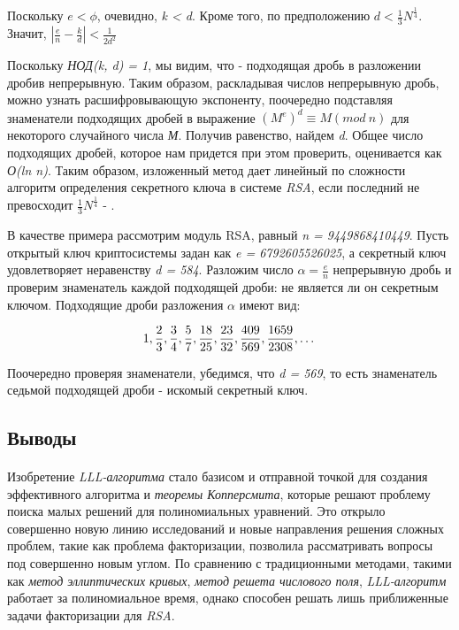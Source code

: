   Поскольку \textit{{$e < \phi$}}, очевидно, \textit{k < d}. Кроме того, по предположению \textit{{$d < \frac{1}{3} N^\frac{1}{4} $}}. Значит, 
  \textit{{$ |\frac{e}{n} - \frac{k}{d}| < \frac{1}{2 d^2} $}}
  
  Поскольку \textit{НОД(k, d) = 1}, мы видим, что - подходящая дробь в разложении дробив непрерывную. Таким образом, раскладывая числов непрерывную дробь, можно узнать 
  расшифровывающую экспоненту, поочередно подставляя знаменатели подходящих дробей в выражение $(M^{e})^{d} \equiv M (mod \: n)$ для некоторого случайного числа \textit{М}. 
  Получив равенство, найдем \textit{d}. Общее число подходящих дробей, которое нам придется при этом проверить, оценивается как \textit{О(ln n)}. 
  Таким образом, изложенный метод дает линейный по сложности алгоритм определения секретного ключа в системе \textit{RSA}, если последний не превосходит 
  \textit{{$\frac{1}{3} N^\frac{1}{4} $}} - \cite[Глава 9.4, страницы 174-177]{tilb06}.
  
  \begin{example}
    В качестве примера рассмотрим модуль RSA, равный \textit{n = 9449868410449}. Пусть открытый ключ криптосистемы задан как \textit{e = 6792605526025},
    а секретный ключ удовлетворяет неравенству \textit{d = 584}. Разложим число \textit{{$ \alpha = \frac{e}{n} $}} непрерывную дробь и проверим знаменатель каждой 
    подходящей дроби: не является ли он секретным ключом. Подходящие дроби разложения \textit{{$ \alpha $}} имеют вид:
    
      \begin{equation}
	\textit{{$ 1, \frac{2}{3}, \frac{3}{4}, \frac{5}{7}, \frac{18}{25}, \frac{23}{32}, \frac{409}{569}, \frac{1659}{2308}, \dots$}}
      \end{equation}

    Поочередно проверяя знаменатели, убедимся, что \textit{d = 569}, то есть знаменатель седьмой подходящей дроби - искомый секретный ключ.
  \end{example}
  
  
\subsection{Выводы}

\paragraph{} Изобретение \textit{LLL-алгоритма} стало базисом и отправной точкой для создания эффективного алгоритма и \textit{теоремы Копперсмита}, которые
  решают проблему поиска малых решений для полиномиальных уравнений. Это открыло совершенно новую линию исследований и новые направления решения
  сложных проблем, такие как проблема факторизации, позволила рассматривать вопросы под совершенно новым углом. По сравнению с
  традиционными методами, такими как \textit{метод эллиптических кривых}, \textit{метод решета числового поля}, \textit{LLL-алгоритм} работает за полиномиальное время,
  однако способен решать лишь приближенные задачи факторизации для \textit{RSA}.
  
